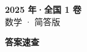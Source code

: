 \documentclass[zihao=-4, a4paper]{ctexart}
\begin{document}
\begin{center}
  {\Large\bfseries 2025 年·全国 1 卷}\\[4pt]
  {\large 数学 · 简答版}
\end{center}
\medskip
{}

\clearpage
{}
\begin{center}{\Large\bfseries 答案速查}\end{center}
\medskip

\end{document}
